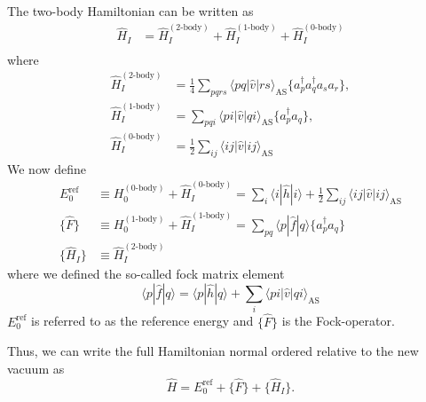 \documentclass[a4paper,10pt]{article}
\newcommand{\braket}[1]{\langle#1\rangle}
\theoremstyle{definition}
\begin{document}
The two-body Hamiltonian can be written as 
\begin{align}
 \hat{H}_I &= \hat{H}_I^{(2\text{-body})} + \hat{H}_I^{(1\text{-body})} + \hat{H}_I^{(0\text{-body})} \\
\end{align}
where 
\begin{align}
 \hat{H}_I^{(2\text{-body})} &= \frac{1}{4}\sum_{pqrs} \braket{pq|\hat{v}|rs}_{\text{AS}}\{a_p^\dagger a_q^\dagger a_s a_r \}, \\
 \hat{H}_I^{(1\text{-body})} &= \sum_{pqi} \braket{pi|\hat{v}|qi}_{\text{AS}} \{a_p^\dagger a_q \}, \\
 \hat{H}_I^{(0\text{-body})} &= \frac{1}{2} \sum_{ij} \braket{ij|\hat{v}|ij}_{\text{AS}}
\end{align}
We now define 
\begin{align*}
 E_0^{\text{ref}} &\equiv H_0^{(0\text{-body})} + \hat{H}_I^{(0\text{-body})} = \sum_i \braket{i|\hat{h}|i} + \frac{1}{2} \sum_{ij} \braket{ij|\hat{v}|ij}_{\text{AS}} \\
 \{ \hat{F} \} &\equiv H_0^{(1\text{-body})} + \hat{H}_I^{(1\text{-body})} = \sum_{pq} \braket{p|\hat{f}|q} \{a_p^\dagger a_q\} \\
 \{ \hat{H}_I \} &\equiv \hat{H}_I^{(2\text{-body})}
\end{align*}
where we defined the so-called fock matrix element 
\begin{equation}
 \braket{p|\hat{f}|q} = \braket{p|\hat{h}|q} + \sum_i \braket{pi|\hat{v}|qi}_{\text{AS}}
\end{equation}
$E_0^\text{ref}$ is referred to as the reference energy and $\{ \hat{F} \}$ is the Fock-operator.

Thus, we can write the full Hamiltonian normal ordered relative to the new vacuum as 
\begin{equation}
 \hat{H} =  E_0^{\text{ref}} + \{ \hat{F} \} + \{ \hat{H}_I \}.
\end{equation}
\end{document}
